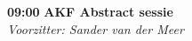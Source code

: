 \documentclass[a4paper,10pt]{report}
\begin{document}
\begin{multicols*}{3}
{}
\begin{packed_enum}
\item[\textbf{09:00}] \textbf{AKF Abstract sessie}\\\textit{Voorzitter: Sander van der Meer}
\end{packed_enum}


\end{multicols*}
\end{document}
